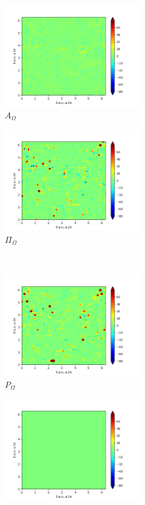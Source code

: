 \begin{figure}[H]
\begin{subfigure}{0.45\textwidth}
        \includegraphics[height=1.75in]{media/run-cds-65/A-enst-1400.png}
        \caption{$A_{\Omega}$}
    \end{subfigure}
    \newline
    \begin{subfigure}{0.45\textwidth}
        \includegraphics[height=1.75in]{media/run-cds-65/Pi-enst-1400.png}
        \caption{$\Pi_{\Omega}$}
    \end{subfigure}
    ~
    \begin{subfigure}{0.45\textwidth}
        \includegraphics[height=1.75in]{media/run-cds-65/P-enst-1400.png}
        \caption{$P_{\Omega}$}
    \end{subfigure}
    \newline
    \begin{subfigure}{0.45\textwidth}
        \includegraphics[height=1.75in]{media/run-cds-65/B-enst-1400.png}

\end{subfigure}
\end{figure}
